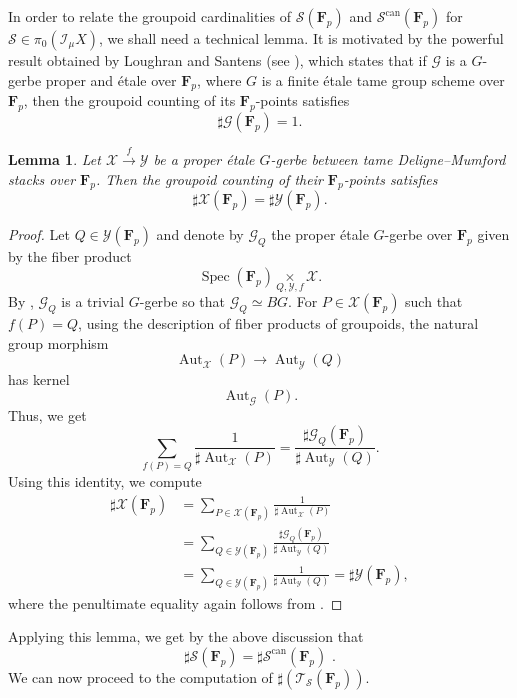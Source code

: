 \documentclass{proc-l}
\newcommand{\F}{\mathbf{F}}
\DeclareMathOperator{\Spec}{Spec}
\DeclareMathOperator{\Aut}{Aut}
\DeclareMathOperator{\can}{can}
\newcommand{\stackX}{\mathcal{X}}
\newcommand{\stackY}{\mathcal{Y}}
\newcommand{\stackS}{\mathcal{S}}
\newcommand{\stackT}{\mathcal{T}}
\newcommand{\stackG}{\mathcal{G}}
\newcommand{\sheafI}{\mathcal{I}}
\newcommand{\sector}{\pi_0(\sheafI_{\mu} X)}
\newtheorem{lemma}[theorem]{Lemma}
\theoremstyle{definition}
\theoremstyle{remark}
\numberwithin{equation}{section}
\begin{document}
In order to relate the groupoid cardinalities of $\stackS(\F_p)$ and $\stackS^{\can}(\F_p)$ for $\stackS \in \sector$, we shall need a technical lemma. It is motivated by the powerful result obtained by Loughran and Santens (see \cite[Lemma 8.8]{loughran_santens_malle_conjecture}), which states that if $\stackG$ is a $G$-gerbe proper and étale over $\F_p$, where $G$ is a finite étale tame group scheme over $\F_p$, then the groupoid counting of its $\F_p$-points satisfies
\[
\sharp \stackG(\F_p) = 1.
\]

\begin{lemma}
Let $\stackX \xrightarrow{f} \stackY$ be a proper étale $G$-gerbe between tame Deligne--Mumford stacks over $\F_p$. Then the groupoid counting of their $\F_p$-points satisfies
\[
\sharp \stackX(\F_p) = \sharp \stackY(\F_p).
\]
\end{lemma}

\begin{proof}
Let $Q \in \stackY(\F_p)$ and denote by $\stackG_{Q}$ the proper étale $G$-gerbe over $\F_p$ given by the
fiber product
\[
\Spec(\F_p) \underset{Q,\stackY,f}{\times} \stackX .
\]
By \cite[Lemma~8.8]{loughran_santens_malle_conjecture}, $\stackG_Q$ is a trivial $G$-gerbe so that
$\stackG_Q \simeq BG$. For $P \in \stackX(\F_p)$ such that $f(P) = Q$, using the description of fiber products of groupoids, the natural group morphism
\[
\Aut_{\stackX}(P) \longrightarrow \Aut_{\stackY}(Q)
\]
has kernel
\[
\Aut_{\stackG}(P).
\]Thus, we get
\[
\sum_{f(P)=Q} \frac{1}{\sharp \Aut_{\stackX}(P)}
=
\frac{\sharp \stackG_Q(\F_p)}{\sharp \Aut_{\stackY}(Q)} .
\]Using this identity, we compute
\begin{align*}
\sharp \stackX(\F_p)
&=
\sum_{P \in \stackX(\F_p)} \frac{1}{\sharp \Aut_{\stackX}(P)} \\
&=
\sum_{Q \in \stackY(\F_p)} \frac{\sharp \stackG_Q(\F_p)}{\sharp \Aut_{\stackY}(Q)} \\
&=
\sum_{Q \in \stackY(\F_p)} \frac{1}{\sharp \Aut_{\stackY}(Q)}
=
\sharp \stackY(\F_p),
\end{align*}
where the penultimate equality again follows from \cite[Lemma~8.8]{loughran_santens_malle_conjecture}.
\end{proof}

Applying this lemma, we get by the above discussion that
\begin{equation}
\sharp \stackS (\F_p) = \sharp \stackS^{\can}(\F_p) \, \, .    
\end{equation}We can now proceed to the computation of $\sharp(\stackT_{\stackS}(\F_p))$. 
\end{document}
